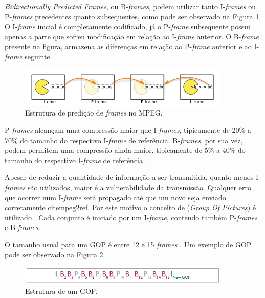 \emph{Bidirectionally Predicted Frames}, ou B-\emph{frames}, podem utilizar tanto I-\emph{frames} ou P-\emph{frames} precedentes quanto subsequentes, como pode ser observado na Figura \ref{fig:ipbframes}. O I-\emph{frame} inicial é completamente codificado, já o P-\emph{frame} subsequente possui apenas a parte que sofreu modificação em relação ao I-\emph{frame} anterior. O B-\emph{frame} presente na figura, armazena as diferenças em relação ao P-\emph{frame} anterior e ao I-\emph{frame} seguinte.

\begin{figure}[!htb]
	\centering
	\includegraphics[width=0.9\textwidth]{./imgs/ipbframes.png}
	\caption{Estrutura de predição de \emph{frames} no MPEG.}
	\label{fig:ipbframes}
\end{figure}

P-\emph{frames} alcançam uma compressão maior que I-\emph{frames}, tipicamente de 20\% a 70\% do tamanho do respectivo I-\emph{frame} de referência. B-\emph{frames}, por sua vez, podem permitem uma compressão ainda maior, tipicamente de 5\% a 40\% do tamanho do respectivo I-\emph{frame} de referência \cite{ciscoieee}.

Apesar de reduzir a quantidade de informação a ser transmitida, quanto menos I-\emph{frames} são utilizados, maior é a vulnerabilidade da transmissão. Qualquer erro que ocorrer num I-\emph{frame} será propagado até que um novo seja enviado corretamente  cite{mpeg2ref}. Por este motivo o conceito de  (\emph{Group Of Pictures}) é utilizado \cite{mpeg2ref}. Cada conjunto é iniciado por um I-\emph{frame}, contendo também P-\emph{frames} e B-\emph{frames}.

O tamanho usual para um GOP é entre 12 e 15 \emph{frames} \cite{ciscoieee, mpeg2ref}. Um exemplo de GOP pode ser observado na Figura \ref{fig:gop}.

\begin{figure}[!htb]
	\centering
	\includegraphics[width=0.9\textwidth]{./imgs/gop.png}
	\caption{Estrutura de um GOP.}
	\label{fig:gop}
\end{figure}

